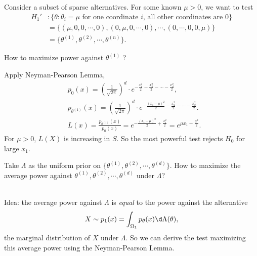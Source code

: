 \documentclass[a4paper]{article}
\begin{document}
\begin{eg}
	Consider a subset of sparse alternatives. For some known $\mu > 0$, we want to test
	\begin{equation*}
		\begin{aligned}
			H_1' &: \{\theta: \theta_i = \mu \text{ for one coordinate $i$, all other coordinates are $0$}\} \\
			&= \{(\mu,0,0,\cdots,0),(0,\mu,0,\cdots,0),\cdots,(0,\cdots,0,0,\mu)\}\\
			&= \{\theta^{(1)}, \theta^{(2)}, \cdots, \theta^{(n)}\}.
		\end{aligned}
	\end{equation*}
	\begin{question}
		How to maximize power against $\theta^{(1)}$ ?
	\end{question}
	\begin{answer}
		Apply Neyman-Pearson Lemma,
		\begin{equation*}
			\begin{aligned}
				& p_0(x) = \left(\frac{1}{\sqrt{2\pi}}\right)^d \cdot e^{-\frac{x_1^2}{2}-\frac{x_2^2}{2}-\cdots-\frac{x_d^2}{2}}, \\
				& p_{\theta^{(1)}}(x) = \left(\frac{1}{\sqrt{2\pi}}\right)^d \cdot e^{-\frac{(x_1 - \mu)^2}{2}-\frac{x_2^2}{2}-\cdots-\frac{x_d^2}{2}}. \\
				& L(x) = \frac{p_{\theta^{(1)}}(x)}{p_0(x)} = e^{-\frac{(x_1 - \mu)^2}{2} + \frac{x_1^2}{2}} = e^{\mu x_1 - \frac{\mu^2}{2}}.
			\end{aligned}
		\end{equation*}
		For $\mu > 0$, $L(X)$ is increasing in $S$. So the most powerful test rejects $H_0$ for large $x_1$.
	\end{answer}
	\begin{question}
		Take $\Lambda$ as the uniform prior on $\{\theta^{(1)}, \theta^{(2)}, \cdots, \theta^{(d)}\}$. How to maximize the average power against $\theta^{(1)}, \theta^{(2)}, \cdots, \theta^{(d)}$ under $\Lambda$?
	\end{question}
	\begin{answer}
		\quad \\
		Idea: the average power against $\Lambda$ is \emph{equal} to the power against the alternative
		\begin{equation}
			X \sim p_1(x) = \int_{\Omega_1} p_\theta(x) \d \Lambda(\theta),
		\end{equation}
		the marginal distribution of $X$ under $\Lambda$. So we can derive the test maximizing this average power using the Neyman-Pearson Lemma.

\end{answer}
\end{eg}
\end{document}
